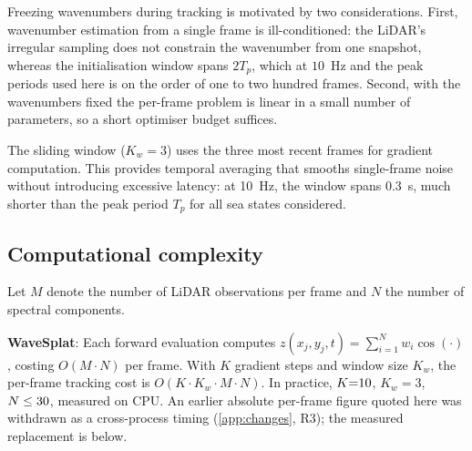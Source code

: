 \documentclass[review]{elsarticle}
\begin{document}
Freezing wavenumbers during tracking is motivated by two considerations.
First, wavenumber estimation from a single frame is ill-conditioned: the LiDAR's
irregular sampling does not constrain the wavenumber from one snapshot, whereas
the initialisation window spans $2T_p$, which at $10$~Hz and the peak periods used
here is on the order of one to two hundred frames.
Second, with the wavenumbers fixed the per-frame problem is linear in a small
number of parameters, so a short optimiser budget suffices.

The sliding window ($K_w = 3$) uses the three most recent frames
for gradient computation.  This provides temporal averaging that
smooths single-frame noise without introducing excessive latency:
at 10~Hz, the window spans 0.3~s, much shorter than the peak
period $T_p$ for all sea states considered.

\subsection{Computational complexity}
\label{sec:complexity}

Let $M$ denote the number of LiDAR observations per frame and
$N$ the number of spectral components.

\textbf{WaveSplat}: Each forward evaluation computes
$z(x_j, y_j, t) = \sum_{i=1}^{N} w_i \cos(\cdot)$,
costing $O(M \cdot N)$ per frame. With $K$ gradient steps and window
size $K_w$, the per-frame tracking cost is $O(K \cdot K_w \cdot M \cdot N)$.
In practice, $K{=}10{}$, $K_w{=}3$, $N \leq 30{}$, measured on
CPU. An earlier absolute per-frame figure quoted here was withdrawn as a
cross-process timing (\ref{app:changes}, R3); the measured replacement is
below.
\end{document}
